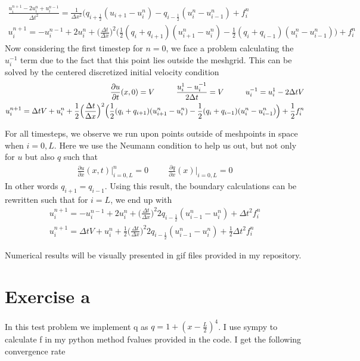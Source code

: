 \documentclass[a4paper,norsk]{article}
\begin{document}
\begin{align*}
\frac{u_i^{n+1}-2u_i^n+u_i^{n-1}}{\Delta t^2} = \frac{1}{\Delta x^2} \Big( q_{i+\frac{1}{2}}(u_{i+1}-u_i^n) - q_{i-\frac{1}{2}}(u_i^n-u_{i-1}^n) + f_i^n \\
u_i^{n+1} = -u_i^{n-1}+2u_i^n + \Big(\frac{\Delta t}{\Delta x}\Big)^2 \Big(\frac{1}{2}(q_i+q_{i+1})(u_{i+1}^n-u_i^n)  
-\frac{1}{2}(q_i+q_{i-1})(u_i^n-u_{i-1}^n)  \Big) +f_i^n
\end{align*}
\newpage
Now considering the first timestep for $n = 0$, we face a problem calculating the $u_i^{-1}$ term due to the fact that this point lies outside the meshgrid. This can be solved by the centered discretized initial velocity condition 
\begin{align*}
\frac{\partial u}{\partial t}(x,0) = V \hspace{1 cm} \frac{u_i^{1}-u_i^{-1}}{2\Delta t} = V \hspace{1 cm} 
u_i^{-1} = u_i^1 - 2\Delta t V \\
u_i^{n+1} = \Delta tV+u_i^n + \frac{1}{2}\Big(\frac{\Delta t}{\Delta x}\Big)^2 \Big(\frac{1}{2}(q_i+q_{i+1})(u_{i+1}^n-u_i^n)  
-\frac{1}{2}(q_i+q_{i-1})(u_i^n-u_{i-1}^n)  \Big) +\frac{1}{2}f_i^n
\end{align*}

For all timesteps, we observe we run upon points outside of meshpoints in space when $i =0,L$. Here we use the Neumann condition to help us out, but not only for $u$ but also $q$ such that
\begin{align*}
\frac{\partial u}{\partial x}(x,t) \Big|_{i=0,L}^n = 0 \hspace{1cm} \frac{\partial q}{\partial x}(x) \Big|_{i=0,L} = 0
\end{align*}
In other words $q_{i+1} = q_{i-1}$. Using this result, the boundary calculations can be rewritten such that for $i=L$, we end up with
\begin{align*}
u_i^{n+1} = -u_i^{n-1}+2u_i^n + \Big(\frac{\Delta t}{\Delta x}\Big)^2 2q_{i-\frac{1}{2}}
(u_{i-1}^n - u_i^n) + \Delta t^2 f_i^n \\ 
u_i^{n+1} = \Delta t V+u_i^n + \frac{1}{2}\Big(\frac{\Delta t}{\Delta x}\Big)^2  2q_{i-\frac{1}{2}}
(u_{i-1}^n - u_i^n) + \frac{1}{2}\Delta t^2 f_i^n
\end{align*}


Numerical results will be visually presented in gif files provided in my repository.

\section*{Exercise a}
In this test problem we implement q as $q = 1 + (x-\frac{L}{2})^4$. I use sympy to calculate f in my python method fvalues provided in the code. I get the following convergence rate
\end{document}
